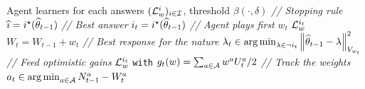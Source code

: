 \begin{algorithm}[ht]
\centering
\caption{\LG}
\label{alg:lg}
\begin{algorithmic}[1]
     Agent learners for each answers $(\mathcal{L}^i_w)_{i\in\mathcal{I}}$, threshold $\beta(\cdot,\delta)$
        \State \textit{// Stopping rule}
            \State {} 
             $\widehat{\imath} = i^\star(\widehat{\theta}_{t-1})$
        \EndIf
        \State \textit{// Best answer}
        \State $i_{t} = i^\star(\widehat{\theta}_{t-1})$
        \State \textit{// Agent plays first}
        \State {} $w_{t}$  $\mathcal{L}^{i_t}_w$
        \State {} $W_{t}=W_{t-1}+w_{t}$
        \State \textit{// Best response for the nature}
        \State $\lambda_{t} \in \operatorname*{arg\,min}_{\lambda\in\neg i_t}\left\lVert\widehat{\theta}_{t-1}-\lambda\right\rVert^2_{V_{w_{t}}}$
        \State \textit{// Feed optimistic gains}
        \State {} $\mathcal{L}_w^{i_{t}}$ \texttt{with} $g_{t}(w) = \sum_{a\in\mathcal{A}}w^a U_t^a/2$
        \State \textit{// Track the weights}
        \State {} $a_{t}\in \operatorname*{arg\,min}_{a\in \mathcal A } N_{t-1}^{a} - W_{t}^{a}$
   \EndFor
\end{algorithmic}
\end{algorithm}


